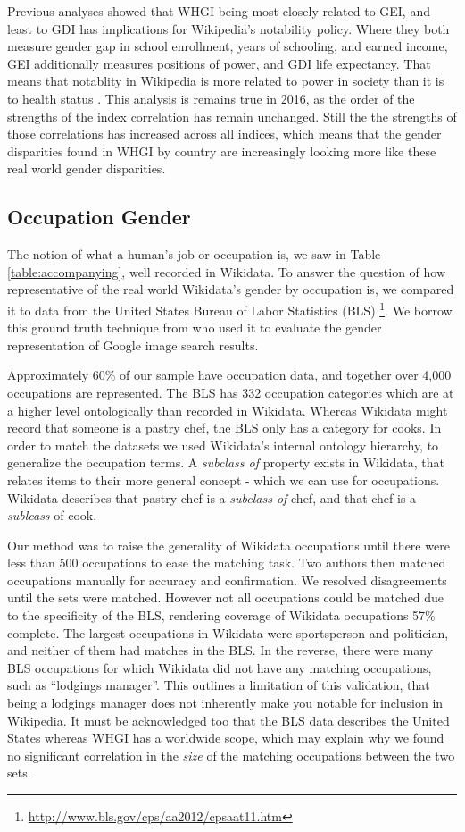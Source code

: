 \documentclass{sig-alternate-05-2015}
\begin{document}
Previous analyses showed that WHGI being most closely related to GEI, and least to GDI has implications for Wikipedia's notability policy. Where they both measure gender gap in school enrollment, years of schooling, and earned income, GEI additionally measures positions of power, and GDI life expectancy. That means that notablity in Wikipedia is more related to power in society than it is to health status \cite{klein_wikipedia_2015}. This analysis is remains true in 2016, as the order of the strengths of the index correlation has remain unchanged. Still the the strengths of those correlations has increased across all indices, which means that the gender disparities found in WHGI by country are increasingly looking more like these real world gender disparities.


\subsection{Occupation Gender}
The notion of what a human's job or occupation is, we saw in Table \ref{table:accompanying}, well recorded in Wikidata. To answer the question of how representative of the real world Wikidata's gender by occupation is, we compared it to data from the United States Bureau of Labor Statistics (BLS) \footnote{\url{http://www.bls.gov/cps/aa2012/cpsaat11.htm}}. We borrow this ground truth technique from \cite{kay_unequal_2015} who used it to evaluate the gender representation of Google image search results.

Approximately 60\% of our sample have occupation data, and together over 4,000 occupations are represented. The BLS has 332 occupation categories which are at a higher level ontologically than  recorded in Wikidata. Whereas Wikidata might record that someone is a pastry chef, the BLS only has a category for cooks. In order to match the datasets we used Wikidata's internal ontology hierarchy, to generalize the occupation terms. A \textit{subclass of} property exists in Wikidata, that relates items to their more general concept - which we can use for occupations. Wikidata describes that pastry chef is a \textit{subclass of} chef, and that chef is a \textit{sublcass} of cook. 

Our method was to raise the generality of Wikidata occupations until there were less than 500 occupations to ease the matching task. Two authors then matched occupations manually for accuracy and confirmation. We resolved disagreements until the sets were matched. However not all occupations could be matched due to the specificity of the BLS, rendering coverage of Wikidata occupations 57\% complete. The largest occupations in Wikidata were sportsperson and politician, and neither of them had matches in the BLS. In the reverse, there were many BLS occupations for which Wikidata did not have any matching occupations, such as ``lodgings manager''. This outlines a limitation of this validation, that being a lodgings manager does not inherently make you notable for inclusion in Wikipedia. It must be acknowledged too that the BLS data describes the United States whereas WHGI has a worldwide scope, which may explain why we found no significant correlation in the \textit{size} of the matching occupations between the two sets.
\end{document}
